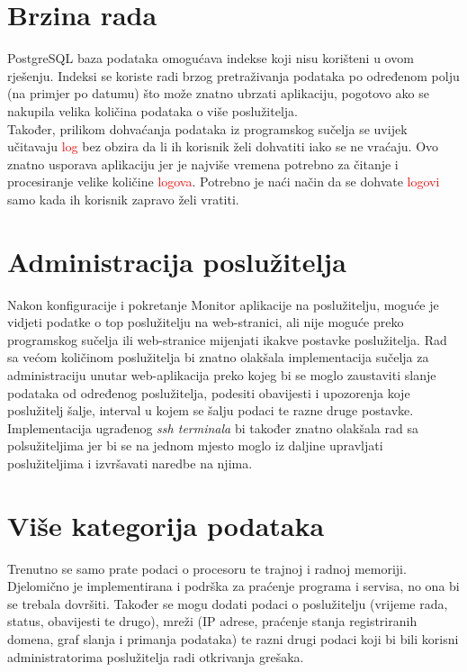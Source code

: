 \documentclass[zavrsnirad]{fer}
\begin{document}
\section{Brzina rada}
PostgreSQL baza podataka omogućava indekse koji nisu korišteni u ovom rješenju. Indeksi se koriste radi brzog pretraživanja podataka po određenom polju (na primjer po datumu) što može znatno ubrzati aplikaciju, pogotovo ako se nakupila velika količina podataka o više poslužitelja.
\\Također, prilikom dohvaćanja podataka iz programskog sučelja se uvijek učitavaju \textcolor{red}{log} bez obzira da li ih korisnik želi dohvatiti iako se ne vraćaju. Ovo znatno usporava aplikaciju jer je najviše vremena potrebno za čitanje i procesiranje velike količine \textcolor{red}{logova}. Potrebno je naći način da se dohvate \textcolor{red}{logovi} samo kada ih korisnik zapravo želi vratiti.

\section{Administracija poslužitelja}
Nakon konfiguracije i pokretanje Monitor aplikacije na poslužitelju, moguće je vidjeti podatke o top poslužitelju na web-stranici, ali nije moguće preko programskog sučelja ili web-stranice mijenjati ikakve postavke poslužitelja. Rad sa većom količinom poslužitelja bi znatno olakšala implementacija sučelja za administraciju unutar web-aplikacija preko kojeg bi se moglo zaustaviti slanje podataka od određenog poslužitelja, podesiti obavijesti i upozorenja koje poslužitelj šalje, interval u kojem se šalju podaci te razne druge postavke.
\\Implementacija ugrađenog \textit{ssh terminala} bi također znatno olakšala rad sa polsužiteljima jer bi se na jednom mjesto moglo iz daljine upravljati poslužiteljima i izvršavati naredbe na njima.

\section{Više kategorija podataka}
Trenutno se samo prate podaci o procesoru te trajnoj i radnoj memoriji. Djelomično je implementirana i podrška za praćenje programa i servisa, no ona bi se trebala dovršiti. Također se mogu dodati podaci o poslužitelju (vrijeme rada, status, obavijesti te drugo), mreži (IP adrese, praćenje stanja registriranih domena, graf slanja i primanja podataka) te razni drugi podaci koji bi bili korisni administratorima poslužitelja radi otkrivanja grešaka.
\end{document}
